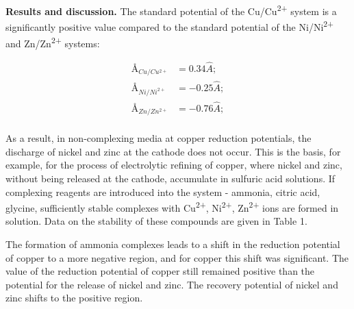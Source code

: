 \begin{multicols}{2}
{\bfseries Results and discussion.} The standard potential of the
Cu/Cu\textsuperscript{2+} system is a significantly positive value
compared to the standard potential of the Ni/Ni\textsuperscript{2+} and
Zn/Zn\textsuperscript{2+} systems:

\begin{align*}
\text{\AA}_{Cu/Cu^{2+}}&=0.34\hat{A}; \\
\text{\AA}_{Ni/Ni^{2+}}&=-0.25\hat{A}; \\
\text{\AA}_{Zn/Zn^{2+}}&=-0.76\hat{A}; \\
\end{align*}

As a result, in non-complexing media at copper reduction potentials, the
discharge of nickel and zinc at the cathode does not occur. This is the
basis, for example, for the process of electrolytic refining of copper,
where nickel and zinc, without being released at the cathode, accumulate
in sulfuric acid solutions. If complexing reagents are introduced into
the system - ammonia, citric acid, glycine, sufficiently stable
complexes with Cu\textsuperscript{2+}, Ni\textsuperscript{2+},
Zn\textsuperscript{2+} ions are formed in solution. Data on the
stability of these compounds are given in Table 1.

The formation of ammonia complexes leads to a shift in the reduction
potential of copper to a more negative region, and for copper this shift
was significant. The value of the reduction potential of copper still
remained positive than the potential for the release of nickel and zinc.
The recovery potential of nickel and zinc shifts to the positive region.
\end{multicols}

